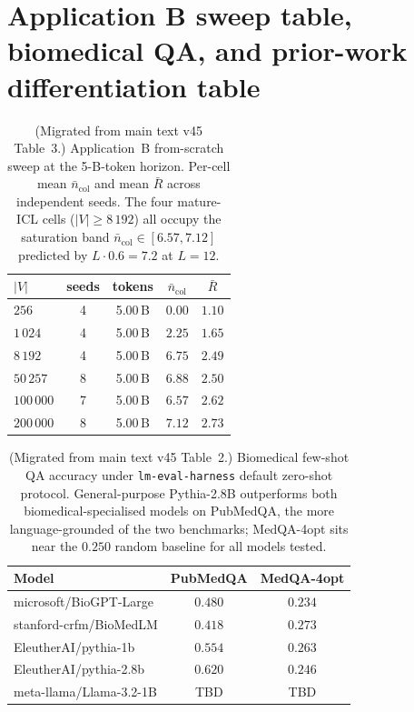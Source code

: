 \documentclass[11pt,a4paper]{article}
\begin{document}
\section{Application B sweep table, biomedical QA, and prior-work
differentiation table}
\label{si:S16}

\begin{table}[h]
\centering
\small
\caption{(Migrated from main text v45 Table~3.) Application~B
from-scratch sweep at the 5-B-token horizon. Per-cell mean
$\bar n_\mathrm{col}$ and mean $\bar R$ across independent seeds.
The four mature-ICL cells ($|V|\!\geq\!8\,192$) all occupy the
saturation band $\bar n_\mathrm{col}\!\in\![6.57, 7.12]$ predicted
by $L\!\cdot\!0.6\!=\!7.2$ at $L\!=\!12$.}
\label{tab:appB}
\begin{tabular}{lcccc}
\toprule
$|V|$ & seeds & tokens & $\bar n_\mathrm{col}$ & $\bar R$ \\
\midrule
$256$       & 4 & 5.00\,B & $0.00$ & $1.10$ \\
$1\,024$    & 4 & 5.00\,B & $2.25$ & $1.65$ \\
$8\,192$    & 4 & 5.00\,B & $6.75$ & $2.49$ \\
$50\,257$   & 8 & 5.00\,B & $6.88$ & $2.50$ \\
$100\,000$  & 7 & 5.00\,B & $6.57$ & $2.62$ \\
$200\,000$  & 8 & 5.00\,B & $7.12$ & $2.73$ \\
\bottomrule
\end{tabular}
\end{table}

\begin{table}[h]
\centering
\small
\caption{(Migrated from main text v45 Table~2.) Biomedical few-shot
QA accuracy under \texttt{lm-eval-harness} default zero-shot
protocol. General-purpose Pythia-2.8B outperforms both
biomedical-specialised models on PubMedQA, the more
language-grounded of the two benchmarks; MedQA-4opt sits near the
$0.250$ random baseline for all models tested.}
\label{tab:biomedical}
\begin{tabular}{lcc}
\toprule
Model & PubMedQA & MedQA-4opt \\
\midrule
microsoft/BioGPT-Large            & $0.480$ & $0.234$ \\
stanford-crfm/BioMedLM            & $0.418$ & $0.273$ \\
EleutherAI/pythia-1b              & $0.554$ & $0.263$ \\
EleutherAI/pythia-2.8b            & $0.620$ & $0.246$ \\
meta-llama/Llama-3.2-1B           & TBD     & TBD     \\
\bottomrule
\end{tabular}
\end{table}
\end{document}
